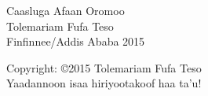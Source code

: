 \documentclass[11pt,b5paper]{book}
\begin{document}
\renewcommand\refname{Kitaabilee Wabii} 
\begin{titlepage}
\centering
\thispagestyle{empty}
{\Huge Caasluga Afaan Oromoo}\\
\vspace{3.0\baselineskip}
\vspace{3.0\baselineskip}
\vspace{3.0\baselineskip}
{\Large Tolemariam Fufa Teso}\\
\vspace{3.0\baselineskip}
\vspace{3.0\baselineskip}
\vspace{3.0\baselineskip}
\vspace{3.0\baselineskip}
\vspace{3.0\baselineskip}
\vspace{3.0\baselineskip}
{\small Finfinnee/Addis Ababa 2015}\\
\vspace{3.0\baselineskip}
\date{}
\end{titlepage}
\newpage

\thispagestyle{empty}
  Copyright: \copyright 2015 Tolemariam Fufa Teso\\

\newpage
\thispagestyle{empty}
Yaadannoon isaa hiriyootakoof haa ta'u!

\newpage
\thispagestyle{empty}
\tableofcontents
\newpage
\end{document}
